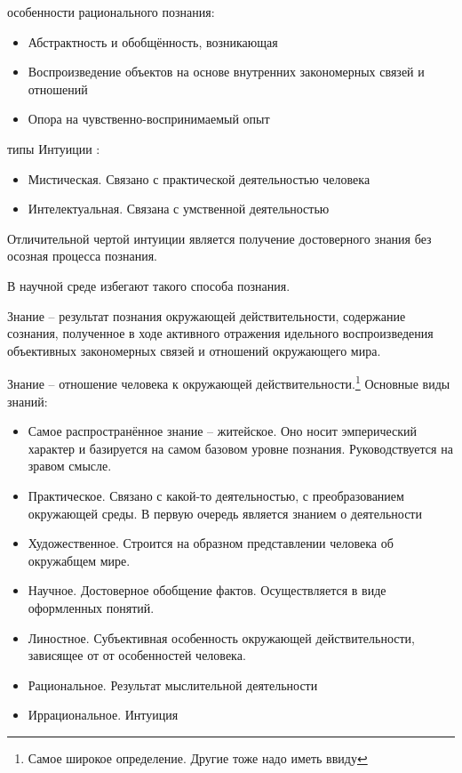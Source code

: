\documentclass[12pt,a4paper]{book}
\begin{document}
особенности рационального познания:
\begin{itemize}
	\item Абстрактность и обобщённость, возникающая
	\item Воспроизведение объектов на основе внутренних закономерных связей и отношений
	\item Опора на чувственно-воспринимаемый опыт
\end{itemize}

типы Интуиции :
\begin{itemize}
	\item Мистическая. Связано с практической деятельностью человека
	\item Интелектуальная. Связана с умственной деятельностью
\end{itemize}

Отличительной чертой интуиции является получение достоверного знания без осозная процесса познания.

В научной среде избегают такого способа познания.

Знание -- результат познания окружающей действительности, содержание сознания, полученное в ходе активного отражения идельного воспроизведения объективных закономерных связей и отношений окружающего мира.

Знание -- отношение человека к окружающей действительности.\footnote{Самое широкое определение. Другие тоже надо иметь ввиду}
Основные виды знаний:
\begin{itemize}

	\item Самое распространённое знание -- житейское.
	Оно носит эмперический характер и базируется на самом базовом уровне познания. Руководствуется на зравом смысле.
	\item Практическое. Связано с какой-то деятельностью, с преобразованием окружающей среды. В первую очередь является знанием о деятельности
	\item Художественное. Строится на образном представлении человека об окружабщем мире.
	\item Научное. Достоверное обобщение фактов. Осуществляется в виде оформленных понятий.
	\item Линостное. Субъективная особенность окружающей действительности, зависящее от от особенностей человека.
	\item Рациональное. Результат мыслительной деятельности
	\item Иррациональное. Интуиция
\end{itemize}
\end{document}
